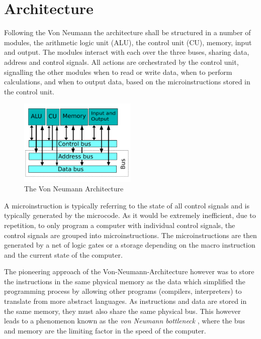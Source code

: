 \section{Architecture}

Following the Von Neumann the architecture shall be structured in a number of modules, the arithmetic logic unit (ALU), the control unit (CU), memory, input and output. The modules interact with each over the three buses, sharing data, address and control signals. All actions are orchestrated by the control unit, signalling the other modules when to read or write data, when to perform calculations, and when to output data, based on the microinstructions stored in the control unit.

\begin{figure}[H]
  \begin{center}
    \includegraphics[width=0.5\textwidth]{figures/VNA}
  \end{center}
  \caption{The Von Neumann Architecture \cite{fig-vna}}\label{fig:vna}
\end{figure}

A microinstruction is typically referring to the state of all control signals and is typically generated by the microcode. As it would be extremely inefficient, due to repetition, to only program a computer with individual control signals, the control signals are grouped into microinstructions. The microinstructions are then generated by a net of logic gates or a storage depending on the macro instruction and the current state of the computer.

The pioneering approach of the Von-Neumann-Architecture however was to store the instructions in the same physical memory as the data which simplified the programming process by allowing other programs (compilers, interpreters) to translate from more abstract languages. As instructions and data are stored in the same memory, they must also share the same physical bus. This however leads  to a phenomenon known as the \textit{von Neumann bottleneck} \cite{cit.needed}, where the bus and memory are the limiting factor in the speed of the computer. 

